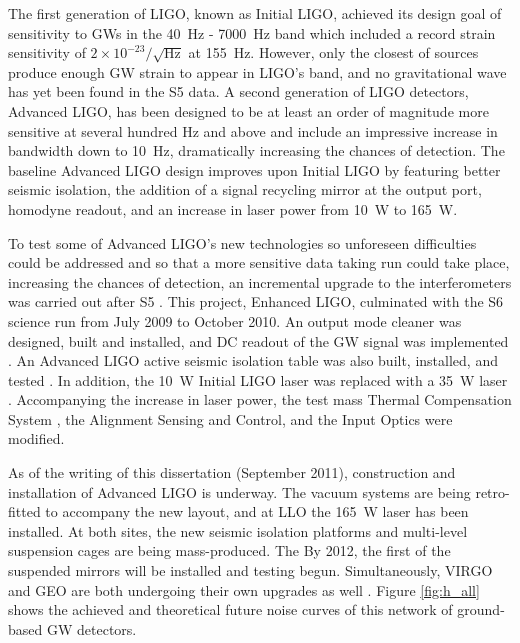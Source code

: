 The first generation of LIGO, known as Initial LIGO, achieved its
design goal of sensitivity to GWs in the 40~Hz - 7000~Hz band which
included a record strain sensitivity of
$2\times10^{-23}/\sqrt{\mathrm{Hz}}$ at 155~Hz. However, only the
closest of sources produce enough GW strain to appear in LIGO's band,
and no gravitational wave has yet been found in the S5 data. A second
generation of LIGO detectors, Advanced LIGO, has been designed to be
at least an order of magnitude more sensitive at several hundred Hz
and above and include an impressive increase in bandwidth down to
10~Hz, dramatically increasing the chances of detection. The baseline
Advanced LIGO design \cite{AdvLigoSysDesign} improves upon Initial
LIGO by featuring better seismic isolation, the addition of a signal
recycling mirror at the output port, homodyne readout, and an increase
in laser power from 10~W to 165~W.

To test some of Advanced LIGO's new technologies so unforeseen
difficulties could be addressed and so that a more sensitive data
taking run could take place, increasing the chances of detection, an
incremental upgrade to the interferometers was carried out after S5
\cite{Adhikari2006Enhanced}. This project, Enhanced LIGO, culminated
with the S6 science run from July 2009 to October 2010.  An output
mode cleaner was designed, built and installed, and DC readout of the
GW signal was implemented \cite{Fricke2011DC}. An Advanced LIGO active
seismic isolation table was also built, installed, and tested
\cite[Ch. 5]{KisselThesis}. In addition, the 10~W Initial LIGO laser
was replaced with a 35~W laser
\cite{Frede2007Fundamental}. Accompanying the increase in laser power, 
the test mass Thermal Compensation System \cite{Willems2009Thermal},
the Alignment Sensing and Control, and the Input Optics were modified.

As of the writing of this dissertation (September 2011), construction
and installation of Advanced LIGO is underway. The vacuum systems are
being retro-fitted to accompany the new layout, and at LLO the 165~W
laser has been installed. At both sites, the new seismic isolation
platforms and multi-level suspension cages are being
mass-produced. The By 2012, the first of the suspended mirrors will be
installed and testing begun. Simultaneously, VIRGO and GEO are both
undergoing their own upgrades as well \cite{Acernese2008Virgo,
  Luck2010Upgrade}. Figure \ref{fig:h_all} shows the achieved and
theoretical future noise curves of this network of ground-based GW
detectors.

